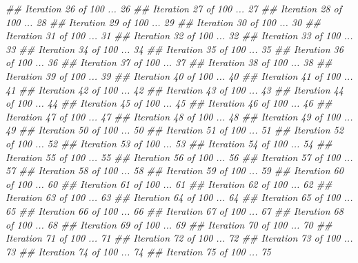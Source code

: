 \documentclass[
]{book}
\newenvironment{Shaded}{\begin{snugshade}}{\end{snugshade}}
\newcommand{\CommentTok}[1]{\textcolor[rgb]{0.56,0.35,0.01}{\textit{#1}}}
\begin{document}
\begin{Shaded}
\begin{Highlighting}[]
{{{{{{{{{{{{{{{{{{{{{{{{{\CommentTok{## Iteration 26 of 100 ... 26%
\CommentTok{## Iteration 27 of 100 ... 27%
\CommentTok{## Iteration 28 of 100 ... 28%
\CommentTok{## Iteration 29 of 100 ... 29%
\CommentTok{## Iteration 30 of 100 ... 30%
\CommentTok{## Iteration 31 of 100 ... 31%
\CommentTok{## Iteration 32 of 100 ... 32%
\CommentTok{## Iteration 33 of 100 ... 33%
\CommentTok{## Iteration 34 of 100 ... 34%
\CommentTok{## Iteration 35 of 100 ... 35%
\CommentTok{## Iteration 36 of 100 ... 36%
\CommentTok{## Iteration 37 of 100 ... 37%
\CommentTok{## Iteration 38 of 100 ... 38%
\CommentTok{## Iteration 39 of 100 ... 39%
\CommentTok{## Iteration 40 of 100 ... 40%
\CommentTok{## Iteration 41 of 100 ... 41%
\CommentTok{## Iteration 42 of 100 ... 42%
\CommentTok{## Iteration 43 of 100 ... 43%
\CommentTok{## Iteration 44 of 100 ... 44%
\CommentTok{## Iteration 45 of 100 ... 45%
\CommentTok{## Iteration 46 of 100 ... 46%
\CommentTok{## Iteration 47 of 100 ... 47%
\CommentTok{## Iteration 48 of 100 ... 48%
\CommentTok{## Iteration 49 of 100 ... 49%
\CommentTok{## Iteration 50 of 100 ... 50%
\CommentTok{## Iteration 51 of 100 ... 51%
\CommentTok{## Iteration 52 of 100 ... 52%
\CommentTok{## Iteration 53 of 100 ... 53%
\CommentTok{## Iteration 54 of 100 ... 54%
\CommentTok{## Iteration 55 of 100 ... 55%
\CommentTok{## Iteration 56 of 100 ... 56%
\CommentTok{## Iteration 57 of 100 ... 57%
\CommentTok{## Iteration 58 of 100 ... 58%
\CommentTok{## Iteration 59 of 100 ... 59%
\CommentTok{## Iteration 60 of 100 ... 60%
\CommentTok{## Iteration 61 of 100 ... 61%
\CommentTok{## Iteration 62 of 100 ... 62%
\CommentTok{## Iteration 63 of 100 ... 63%
\CommentTok{## Iteration 64 of 100 ... 64%
\CommentTok{## Iteration 65 of 100 ... 65%
\CommentTok{## Iteration 66 of 100 ... 66%
\CommentTok{## Iteration 67 of 100 ... 67%
\CommentTok{## Iteration 68 of 100 ... 68%
\CommentTok{## Iteration 69 of 100 ... 69%
\CommentTok{## Iteration 70 of 100 ... 70%
\CommentTok{## Iteration 71 of 100 ... 71%
\CommentTok{## Iteration 72 of 100 ... 72%
\CommentTok{## Iteration 73 of 100 ... 73%
\CommentTok{## Iteration 74 of 100 ... 74%
\CommentTok{## Iteration 75 of 100 ... 75%
}}}}}}}}}}}}}}}}}}}}}}}}}}}}}}}}}}}}}}}}}}}}}}}}}}}}}}}}}}}}}}}}}}}}}}}}}}}
\end{Highlighting}
\end{Shaded}
\end{document}
